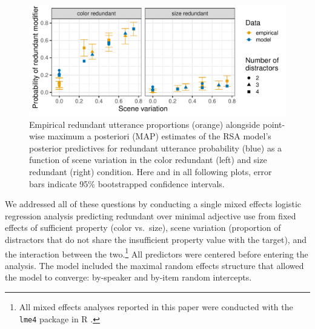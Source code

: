 \documentclass[11pt]{article}
\begin{document}
\begin{figure}
\centering
\includegraphics[width=.8\textwidth]{pics/exp1-empirical-predictives}
\caption{Empirical redundant utterance proportions  (orange)  alongside point-wise maximum a posteriori (MAP) estimates of the RSA model's posterior predictives for redundant utterance probability (blue) as a function of scene variation in the color redundant (left) and size redundant (right) condition. Here and in all following plots, error bars indicate 95\% bootstrapped confidence intervals.}
\label{fig:exp1results}
\end{figure}

We addressed all of these questions by conducting a single mixed effects logistic regression analysis predicting redundant over minimal adjective use from fixed effects of sufficient property (color vs.~size), scene variation (proportion of distractors that do not share the insufficient property value with the target), and the interaction between the two.\footnote{All mixed effects analyses reported in this paper were conducted with the \verb+lme4+ package \cite{lme4} in R \cite{R}.} All predictors were centered before entering the analysis. The model included the maximal random effects structure that allowed the model to converge: by-speaker and by-item random intercepts.
\end{document}
